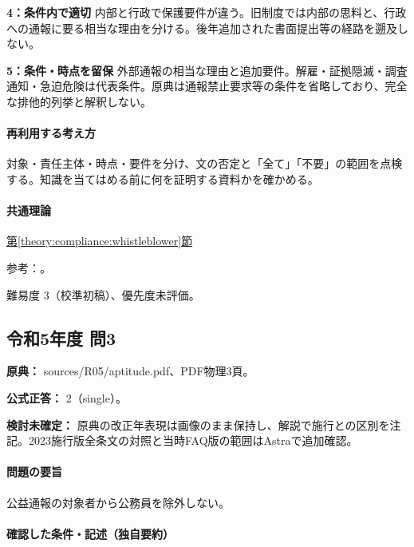 \noindent\textbf{4：条件内で適切} 内部と行政で保護要件が違う。旧制度では内部の思料と、行政への通報に要る相当な理由を分ける。後年追加された書面提出等の経路を遡及しない。\par

\noindent\textbf{5：条件・時点を留保} 外部通報の相当な理由と追加要件。解雇・証拠隠滅・調査通知・急迫危険は代表条件。原典は通報禁止要求等の条件を省略しており、完全な排他的列挙と解釈しない。\par

\paragraph{再利用する考え方} 対象・責任主体・時点・要件を分け、文の否定と「全て」「不要」の範囲を点検する。知識を当てはめる前に何を証明する資料かを確かめる。

\paragraph{共通理論} \hyperref[theory:compliance:whistleblower]{第\ref*{theory:compliance:whistleblower}節}

\par 参考：\cite{caa_handbook_pre2022,saf53_whistle_oldfaq}。

\par 難易度 3（校準初稿）、優先度未評価。

\subsection{令和5年度 問3}
\label{q:r05-reg-apt-03}

\noindent\textbf{原典：} sources/R05/aptitude.pdf、PDF物理3頁。

\textbf{公式正答：} 2（single）。

\par\textbf{検討未確定：} 原典の改正年表現は画像のまま保持し、解説で施行との区別を注記。2023施行版全条文の対照と当時FAQ版の範囲はAstraで追加確認。

\paragraph{問題の要旨} 公益通報の対象者から公務員を除外しない。

\paragraph{確認した条件・記述（独自要約）}\mbox{}\par

